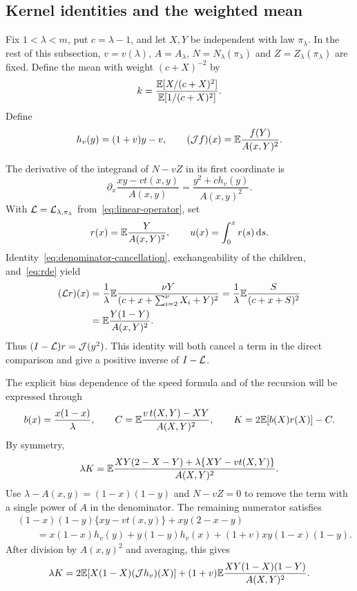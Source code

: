 \subsection{Kernel identities and the weighted mean}\label{sec:kernel-identities}
Fix $1<\lambda<m$, put $c=\lambda-1$, and let $X,Y$ be independent with law $\pi_\lambda$. In the rest of this subsection, $v=v(\lambda)$, $A=A_\lambda$, $N=N_\lambda(\pi_\lambda)$ and $Z=Z_\lambda(\pi_\lambda)$ are fixed. Define the mean with weight $(c+X)^{-2}$ by
\begin{equation}\label{eq:weighted-mean}
 k=\frac{\mathbb E[X/(c+X)^2]}{\mathbb E[1/(c+X)^2]}.
\end{equation}
Define
\begin{equation}\label{eq:J-h}
 h_v(y)=(1+v)y-v,\qquad
 (\mathcal J f)(x)=\mathbb E\frac{f(Y)}{A(x,Y)^2}.
\end{equation}

The derivative of the integrand of $N-vZ$ in its first coordinate is
\begin{equation}\label{eq:variation-kernel}
 \partial_x\frac{xy-vt(x,y)}{A(x,y)}
 =\frac{y^2+c h_v(y)}{A(x,y)^2}.
\end{equation}
With $\mathcal L=\mathcal L_{\lambda,\pi_\lambda}$ from~\eqref{eq:linear-operator}, set
\begin{equation}\label{eq:correction}
 r(x)=\mathbb E\frac{Y}{A(x,Y)^2},\qquad u(x)=\int_0^x r(s)\,\mathrm d s.
\end{equation}
Identity~\eqref{eq:denominator-cancellation}, exchangeability of the children, and~\eqref{eq:rde} yield
\begin{align}\label{eq:Lr}
 (\mathcal L r)(x)
 &=\frac1\lambda\mathbb E\frac{\nu Y}{(c+x+\sum_{i=2}^{\nu}X_i+Y)^2}
 =\frac1\lambda\mathbb E\frac{S}{(c+x+S)^2}\notag\\
 &=\mathbb E\frac{Y(1-Y)}{A(x,Y)^2}.
\end{align}
Thus $(I-\mathcal L)r=\mathcal J(y^2)$. This identity will both cancel a term in the direct comparison and give a positive inverse of $I-\mathcal L$.

The explicit bias dependence of the speed formula and of the recursion will be expressed through
\begin{equation}\label{eq:parameter-margin}
 b(x)=\frac{x(1-x)}{\lambda},\qquad
 C=\mathbb E\frac{v\,t(X,Y)-XY}{A(X,Y)^2},\qquad
 K=2\mathbb E[b(X)r(X)]-C.
\end{equation}
By symmetry,
\begin{equation*}
 \lambda K=\mathbb E\frac{XY(2-X-Y)+\lambda\{XY-vt(X,Y)\}}{A(X,Y)^2}.
\end{equation*}
Use $\lambda-A(x,y)=(1-x)(1-y)$ and $N-vZ=0$ to remove the term with a single power of $A$ in the denominator. The remaining numerator satisfies
\begin{align*}
 &(1-x)(1-y)\{xy-vt(x,y)\}+xy(2-x-y)\\
 &\qquad=x(1-x)h_v(y)+y(1-y)h_v(x)
 +(1+v)xy(1-x)(1-y).
\end{align*}
After division by $A(x,y)^2$ and averaging, this gives
\begin{equation}\label{eq:positive-K}
 \lambda K=2\mathbb E[X(1-X)(\mathcal J h_v)(X)]
 +(1+v)\mathbb E\frac{XY(1-X)(1-Y)}{A(X,Y)^2}.
\end{equation}

